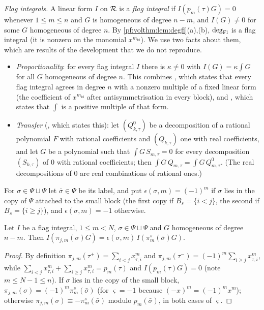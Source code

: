 \emph{Flag integrals.} A linear form $I$ on $\mathcal{R}$ is a \emph{flag integral} if $I(p_m(\tau)G)=0$ whenever
$1\le m\le n$ and $G$ is homogeneous of degree $n-m$, and $I(G)\ne0$ for some $G$ homogeneous of degree $n$. By
\cref{pf:volthm:lem:degfl}(a),(b), $\deg_{\mathrm{Fl}}$ is a flag integral (it is nonzero on the monomial
$x^{m_{\mathrm{id}}}$). We use two facts about them, which are results of the development that we do not reproduce.
\begin{itemize}
\item \emph{Proportionality}: for every flag integral $I$ there is $\kappa\ne0$ with $I(G)=\kappa\int G$ for all $G$
homogeneous of degree $n$. This combines
, which
states that every flag integral agrees in degree $n$ with a nonzero multiple of a fixed linear form (the coefficient of
$x^{m_{\mathrm{id}}}$ after antisymmetrisation in every block), and
, which states that $\int$ is a
positive multiple of that form.
\item \emph{Transfer} (,
which states this): let $(Q^0_{k,\tau})$ be a decomposition of a rational polynomial $F$ with rational coefficients and
$(Q_{k,\tau})$ one with real coefficients, and let $G$ be a polynomial such that $\int G\,S_{m,\tau}=0$ for every decomposition $(S_{k,\tau})$ of $0$
with rational coefficients; then $\int G\,Q_{m,\tau}=\int G\,Q^0_{m,\tau}$. (The real decompositions of $0$ are real
combinations of rational ones.)
\end{itemize}

For $\sigma\in\Psi\sqcup\Psi$ let $\bar\sigma\in\Psi$ be its label, and put $\epsilon(\sigma,m)=(-1)^m$ if $\sigma$ lies in
the copy of $\Psi$ attached to the small block (the first copy if $B_s=\{i<j\}$, the second if $B_s=\{i\ge j\}$), and
$\epsilon(\sigma,m)=-1$ otherwise.

\begin{lemma}\label{pf:volthm:lem:lieclass}
Let $I$ be a flag integral, $1\le m<N$, $\sigma\in\Psi\sqcup\Psi$ and $G$ homogeneous of degree $n-m$. Then
$I(\pi_{j,m}(\sigma)G)=\epsilon(\sigma,m)\,I(\pi^s_m(\bar\sigma)G)$.
\end{lemma}

\begin{proof}
By definition $\pi_{j,m}(\tau^+)=\sum_{i<j}x_{\tau,i}^m$ and $\pi_{j,m}(\tau^-)=(-1)^m\sum_{i\ge j}x_{\tau,i}^m$, while
$\sum_{i<j}x_{\tau,i}^m+\sum_{i\ge j}x_{\tau,i}^m=p_m(\tau)$ and $I(p_m(\tau)G)=0$ (note $m\le N-1\le n$). If $\sigma$ lies in
the copy of the small block, $\pi_{j,m}(\sigma)=(-1)^m\pi^s_m(\bar\sigma)$ (for $\varsigma=-1$ because
$(-x)^m=(-1)^mx^m$); otherwise $\pi_{j,m}(\sigma)\equiv-\pi^s_m(\bar\sigma)$ modulo $p_m(\bar\sigma)$, in both cases of
$\varsigma$.
\end{proof}


